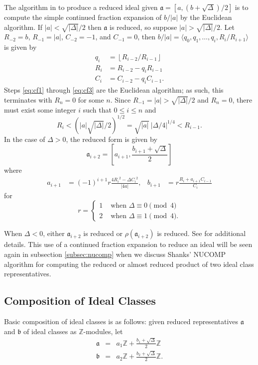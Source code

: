 \documentclass{ucalgthes1}
\theoremstyle{plain}
\theoremstyle{definition}
\newcommand{\ZZ}{\mathbb{Z}}
\newcommand{\floor}[1]{\left\lfloor #1 \right\rfloor}
\begin{document}
The algorithm in \cite[pp.104-105]{Jac09} to produce a reduced ideal given $\mathfrak a = [a, (b+\sqrt\Delta)/2]$ is to compute the simple continued fraction expansion of $b/|a|$ by the Euclidean algorithm.  If $|a| < \sqrt{|\Delta|}/2$ then $\mathfrak a$ is reduced, so suppose $|a| > \sqrt{|\Delta|}/2$.  Let $R_{-2}=b$, $R_{-1}=|a|$, $C_{-2}=-1$, and $C_{-1} = 0$, then $b/|a| = \langle q_0, q_1, \dots, q_i, R_i/R_{i+1} \rangle$ is given by
\begin{align}
	q_i &= \floor{ R_{i-2}/R_{i-1} } \label{eq:cf1} \\
	R_i &= R_{i-2} - q_i R_{i-1} \label{eq:cf2} \\
	C_i &= C_{i-2} - q_i C_{i-1}. \label{eq:cf3}
\end{align}
Steps \eqref{eq:cf1} through \eqref{eq:cf3} are the Euclidean algorithm; as such, this terminates with $R_n = 0$ for some $n$.  Since $R_{-1} = |a| > \sqrt{|\Delta|}/2$ and $R_n = 0$, there must exist some integer $i$ such that $0 \le i \le n$ and 
\[
	R_i < \left(|a|\sqrt{|\Delta|}/2\right)^{1/2} = \sqrt{|a|} ~ {|\Delta/4|}^{1/4} < R_{i-1}.
\]
In the case of $\Delta>0$, the reduced form is given by
\[
	{\mathfrak a}_{i+2} = \left[ a_{i+1}, \frac{b_{i+1} + \sqrt\Delta}{2} \right]
\]
where
\begin{align*}
	a_{i+1} &= (-1)^{i+1} r\frac{ 4{R_i}^2 -\Delta{C_i}^2 }{|4a|}, &
	b_{i+1} &= r\frac{R_i + a_{i+1}C_{i-1}}{C_i}
\end{align*}
for
\[
	r = \begin{cases}
		1 & \mbox{ when } \Delta \equiv 0 \pmod 4 \\
		2 & \mbox{ when } \Delta \equiv 1 \pmod 4.
	\end{cases}
\]

\noindent
When $\Delta<0$, either ${\mathfrak a}_{i+2}$ is reduced or $\rho({\mathfrak a}_{i+2})$ is reduced.  See \cite[pp.~104-106]{Jac09} for additional details.  This use of a continued fraction expansion to reduce an ideal will be seen again in subsection \ref{subsec:nucomp} when we discuss Shanks' NUCOMP algorithm for computing the reduced or almost reduced product of two ideal class representatives.


\subsection{Composition of Ideal Classes}
Basic composition of ideal classes is as follows: given reduced representatives $\mathfrak{a}$ and $\mathfrak{b}$ of ideal classes as $\ZZ$-modules, let
\begin{eqnarray*}
	\mathfrak{a} & = & a_1 \ZZ + \frac{b_1 + \sqrt{\Delta}}{2} \ZZ \\
	\mathfrak{b} & = & a_2 \ZZ + \frac{b_2 + \sqrt{\Delta}}{2} \ZZ.
\end{eqnarray*}
\end{document}
